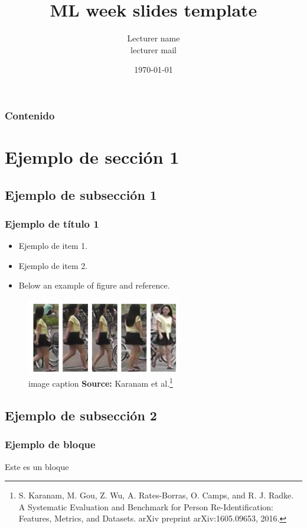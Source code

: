 \documentclass{beamer}
\title{ML week slides template}
\institute{EEPP IIS-UNSAAC}
\author{Lecturer name\\
        lecturer mail}
\date{\today}
\newcommand{\etal}{et al.}
\begin{document}
\frame{\titlepage}
\begin{frame}
    \frametitle{Contenido}
    \footnotesize{
    \tableofcontents
    }
\end{frame}

\section{Ejemplo de sección 1} %
\subsection{Ejemplo de subsección 1}
\begin{frame} 
   \frametitle{Ejemplo de título 1}
   \begin{itemize}
   \item Ejemplo de item 1.
   \item Ejemplo de item 2.
   \item Below an example of figure and reference.
   \end{itemize}
   \begin{figure}[!htb]
        \centering
        \includegraphics[width=0.6\textwidth]{figs/re-id1.png}
        \caption{image caption  \textbf{Source:} Karanam \etal\footnote{S. Karanam, M. Gou, Z. Wu, A. Rates-Borras, O. Camps, and R. J. Radke. A Systematic Evaluation and Benchmark for Person Re-Identification: Features, Metrics, and Datasets. arXiv preprint arXiv:1605.09653, 2016.}}
    \end{figure}
\end{frame}

\subsection{Ejemplo de subsección 2}
\begin{frame}
    \frametitle{Ejemplo de bloque}
    \begin{block}{}
    Este es un bloque
    \end{block}
\end{frame}
\end{document}
